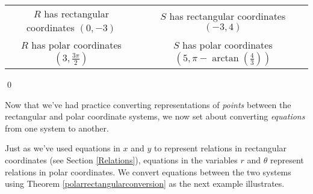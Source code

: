 \documentclass{ximera}
\begin{document}
\begin{ex}
\begin{center}
\begin{tabular}{cc}
$R$ has rectangular coordinates $(0,-3)$ & $S$ has rectangular coordinates $(-3,4)$ \\
$R$ has polar coordinates $\left(3,\frac{3\pi}{2}\right)$ & $S$ has polar coordinates $\left(5, \pi - \arctan\left(\frac{4}{3}\right)\right)$  \\

\end{tabular}

\end{center}

\vspace{-.25in} \qed

\end{ex}

\medskip

Now that we've had practice converting representations of \textit{points} between the rectangular and polar coordinate systems, we now set about converting \textit{equations} from one system to another.  

\smallskip

Just as we've used equations in $x$ and $y$ to represent relations in rectangular coordinates (see Section \ref{Relations}), equations in the variables $r$ and $\theta$ represent relations in polar coordinates.  We convert equations between the two systems using Theorem \ref{polarrectangularconversion} as the next example illustrates.

\medskip
\end{document}
